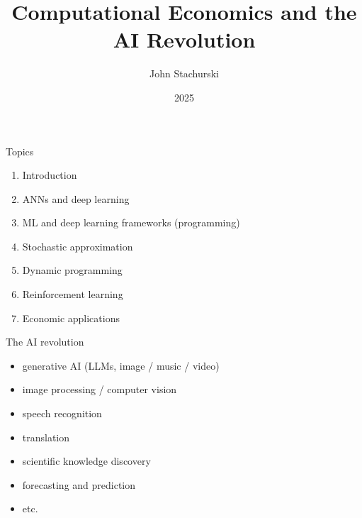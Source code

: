 


\title{Computational Economics and the AI Revolution}



\author{John Stachurski}


\date{2025}




\begin{frame}
  \titlepage
\end{frame}



\begin{frame}{Topics}

    \begin{enumerate}
        \item Introduction
        \vspace{0.5em}
        \item ANNs and deep learning
        \vspace{0.5em}
        \item ML and deep learning frameworks (programming)
        \vspace{0.5em}
        \item Stochastic approximation
        \vspace{0.5em}
        \item Dynamic programming
        \vspace{0.5em}
        \item Reinforcement learning
        \vspace{0.5em}
        \item Economic applications
    \end{enumerate}

\end{frame}



\begin{frame}{The AI revolution}


    \begin{itemize}
        \item generative AI  (LLMs, image / music / video)
        \vspace{0.5em}
        \item image processing / computer vision
        \vspace{0.5em}
        \item speech recognition
        \vspace{0.5em}
        \item translation
        \vspace{0.5em}
        \item scientific knowledge discovery
        \vspace{0.5em}
        \item forecasting and prediction 
        \vspace{0.5em}
        \item etc.
    \end{itemize}

    
\end{frame}


